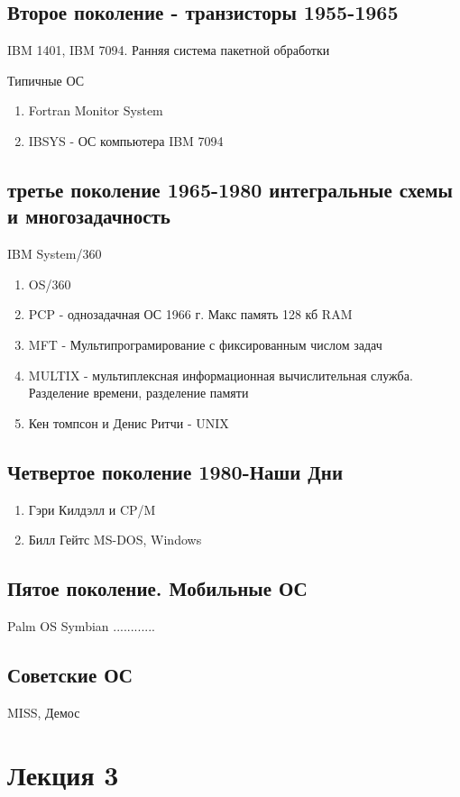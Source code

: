 \documentclass[a4paper]{article}
\begin{document}
\subsection{Второе поколение - транзисторы 1955-1965}
IBM 1401,
IBM 7094.
Ранняя система пакетной обработки

Типичные ОС
\begin{enumerate}
\item Fortran Monitor System
\item IBSYS - ОС компьютера IBM 7094
\end{enumerate}

\subsection{третье поколение 1965-1980 интегральные схемы и многозадачность}
IBM System/360

\begin{enumerate}
\item OS/360
\item PCP - однозадачная ОС 1966 г. Макс память 128 кб RAM
\item MFT - Мультипрограмирование с фиксированным числом задач
\item MULTIX - мультиплексная информационная вычислительная служба. Разделение времени, разделение памяти
\item Кен томпсон и Денис Ритчи - UNIX
\end{enumerate}

\subsection{Четвертое поколение 1980-Наши Дни} 
\begin{enumerate}
\item Гэри Килдэлл и CP/M
\item Билл Гейтс MS-DOS, Windows
\end{enumerate}

\subsection{Пятое поколение. Мобильные ОС}
Palm OS
Symbian
............

\subsection{Советские ОС}
MISS, Демос

\section{Лекция 3}
\end{document}
